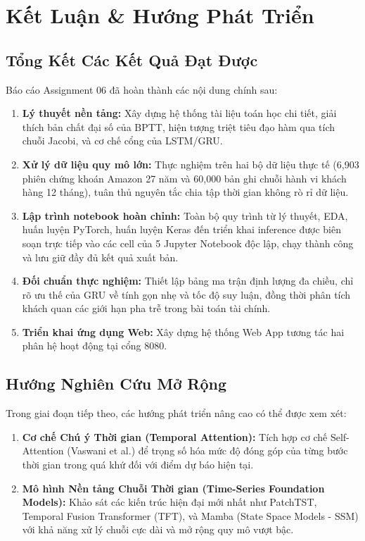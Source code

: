 \documentclass[12pt,a4paper]{report}
\begin{document}
\chapter{Kết Luận \& Hướng Phát Triển}

\section{Tổng Kết Các Kết Quả Đạt Được}
Báo cáo Assignment 06 đã hoàn thành các nội dung chính sau:
\begin{enumerate}
    \item \textbf{Lý thuyết nền tảng:} Xây dựng hệ thống tài liệu toán học chi tiết, giải thích bản chất đại số của BPTT, hiện tượng triệt tiêu đạo hàm qua tích chuỗi Jacobi, và cơ chế cổng của LSTM/GRU.
    \item \textbf{Xử lý dữ liệu quy mô lớn:} Thực nghiệm trên hai bộ dữ liệu thực tế (6,903 phiên chứng khoán Amazon 27 năm và 60,000 bản ghi chuỗi hành vi khách hàng 12 tháng), tuân thủ nguyên tắc chia tập thời gian không rò rỉ dữ liệu.
    \item \textbf{Lập trình notebook hoàn chỉnh:} Toàn bộ quy trình từ lý thuyết, EDA, huấn luyện PyTorch, huấn luyện Keras đến triển khai inference được biên soạn trực tiếp vào các cell của 5 Jupyter Notebook độc lập, chạy thành công và lưu giữ đầy đủ kết quả xuất bản.
    \item \textbf{Đối chuẩn thực nghiệm:} Thiết lập bảng ma trận định lượng đa chiều, chỉ rõ ưu thế của GRU về tính gọn nhẹ và tốc độ suy luận, đồng thời phân tích khách quan các giới hạn pha trễ trong bài toán tài chính.
    \item \textbf{Triển khai ứng dụng Web:} Xây dựng hệ thống Web App tương tác hai phân hệ hoạt động tại cổng 8080.
\end{enumerate}

\section{Hướng Nghiên Cứu Mở Rộng}
Trong giai đoạn tiếp theo, các hướng phát triển nâng cao có thể được xem xét:
\begin{enumerate}
    \item \textbf{Cơ chế Chú ý Thời gian (Temporal Attention):} Tích hợp cơ chế Self-Attention (Vaswani et al.) để trọng số hóa mức độ đóng góp của từng bước thời gian trong quá khứ đối với điểm dự báo hiện tại.
    \item \textbf{Mô hình Nền tảng Chuỗi Thời gian (Time-Series Foundation Models):} Khảo sát các kiến trúc hiện đại mới nhất như PatchTST, Temporal Fusion Transformer (TFT), và Mamba (State Space Models - SSM) với khả năng xử lý chuỗi cực dài và mở rộng quy mô vượt bậc.
\end{enumerate}
\end{document}
